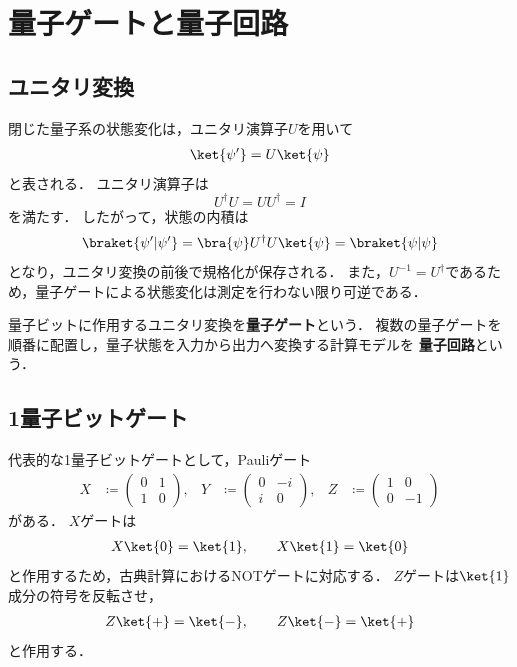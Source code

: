 \section{量子ゲートと量子回路}
\label{sec:quantum-gates-and-circuits}

\subsection{ユニタリ変換}
\label{subsec:unitary-transformation}

閉じた量子系の状態変化は，ユニタリ演算子$U$を用いて
\begin{align*}
  \ket{\psi'}=U\ket{\psi}
\end{align*}
と表される．
ユニタリ演算子は
\begin{equation}
  U^{\dagger}U=UU^{\dagger}=I
  \label{eq:unitary-condition}
\end{equation}
を満たす．
したがって，状態の内積は
\begin{align*}
  \braket{\psi'|\psi'}
  =
  \bra{\psi}U^{\dagger}U\ket{\psi}
  =
  \braket{\psi|\psi}
\end{align*}
となり，ユニタリ変換の前後で規格化が保存される．
また，$U^{-1}=U^{\dagger}$であるため，量子ゲートによる状態変化は測定を行わない限り可逆である．

量子ビットに作用するユニタリ変換を\textbf{量子ゲート}という．
複数の量子ゲートを順番に配置し，量子状態を入力から出力へ変換する計算モデルを
\textbf{量子回路}という．

\subsection{1量子ビットゲート}
\label{subsec:single-qubit-gates}

代表的な1量子ビットゲートとして，Pauliゲート
\begin{align*}
  X&\coloneq
  \begin{pmatrix}
    0 & 1 \\
    1 & 0
  \end{pmatrix},
  &
  Y&\coloneq
  \begin{pmatrix}
    0 & -i \\
    i & 0
  \end{pmatrix},
  &
  Z&\coloneq
  \begin{pmatrix}
    1 & 0 \\
    0 & -1
  \end{pmatrix}
\end{align*}
がある．
$X$ゲートは
\begin{align*}
  X\ket{0}=\ket{1},
  \qquad
  X\ket{1}=\ket{0}
\end{align*}
と作用するため，古典計算におけるNOTゲートに対応する．
$Z$ゲートは$\ket{1}$成分の符号を反転させ，
\begin{align*}
  Z\ket{+}=\ket{-},
  \qquad
  Z\ket{-}=\ket{+}
\end{align*}
と作用する．

